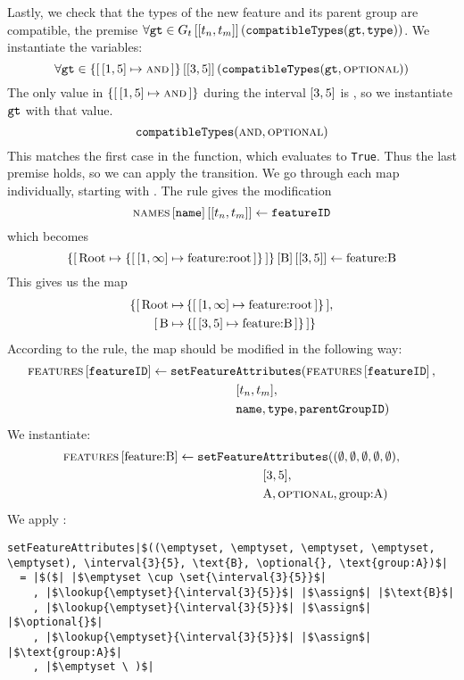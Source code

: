 Lastly, we check that the types of the new feature and its parent group are compatible, the premise $\forall \var{gt} \in \lookup{G_t}{\interval{t_n}{t_m}} (\var{compatibleTypes}(\var{gt}, \var{type}))$. We instantiate the variables:
\[
  \forall \var{gt} \in \lookup{\set{\intervalmapping{1}{5}{\andtype}}}{\interval{3}{5}}(\var{compatibleTypes}(\var{gt}, \optional{}))
\]
The only value in $\set{\intervalmapping{1}{5}{\andtype}}$ during the interval $\interval{3}{5}$ is \andtype, so we instantiate $\texttt{gt}$ with that value.
\[
  \texttt{compatibleTypes}(\textsc{and}{}, \textsc{optional}{})
\]
This matches the first case in the  function, which evaluates to \texttt{True}. Thus the last premise holds, so we can apply the transition. We go through each map individually, starting with \names{}. The rule gives the modification
\[
  \lookup{\lookup{\names{}}{\var{name}}}{\interval{t_n}{t_m}} \assign \var{featureID}
\]
which becomes
\[
  \lookup{\lookup{\{  \mapping{\text{Root}}{\set{\intervalmapping{1}{\forever}{\text{feature:root}}}}\}}{\text{B}}}{\interval{3}{5}} \assign \text{feature:B}
\]
This gives us the map
\begin{align*}
  \{\mapping{\text{Root}}{& \set{\intervalmapping{1}{\forever}{\text{feature:root}}}}, \\
   \mapping{\text{B}}{& \set{\intervalmapping{3}{5}{\text{feature:B}}}}\} 
\end{align*}
According to the rule, the \features{} map should be modified in the following way:
\begin{align*}
  \lookup{\features{}}{\var{featureID}} \assign \var{setFeature}&\var{Attributes}(\lookup{\features{}}{\var{featureID}}, \\
                           &\interval{t_n}{t_m},\\
                           &\var{name}, \var{type}, \var{parentGroupID})
\end{align*}
We instantiate:
\begin{align*}
  \lookup{\features{}}{\text{feature:B}} \assign \var{setFeature}&\var{Attributes}((\emptyset, \emptyset, \emptyset, \emptyset, \emptyset), \\
                           &\interval{3}{5},\\
                           &\text{A}, \optional{}, \text{group:A})
\end{align*}
We apply :
\begin{verbatim}
setFeatureAttributes|$((\emptyset, \emptyset, \emptyset, \emptyset, \emptyset), \interval{3}{5}, \text{B}, \optional{}, \text{group:A})$|
  = |$($| |$\emptyset \cup \set{\interval{3}{5}}$|
    , |$\lookup{\emptyset}{\interval{3}{5}}$| |$\assign$| |$\text{B}$|
    , |$\lookup{\emptyset}{\interval{3}{5}}$| |$\assign$| |$\optional{}$|
    , |$\lookup{\emptyset}{\interval{3}{5}}$| |$\assign$| |$\text{group:A}$|
    , |$\emptyset \ )$|
 \end{verbatim}
